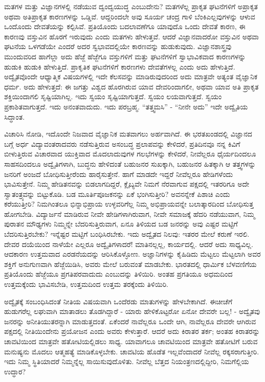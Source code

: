 ಮತಗಳ ಮತ್ತು ವಿಜ್ಞಾನಗಳಲ್ಲಿ ನಡೆಯುವ ದ್ವಂದ್ವಯುದ್ಧ ಎಂಬುದೇನು? ಮತಗಳೆಲ್ಲ ಪ್ರಾಕೃತ ಘಟನೆಗಳಿಗೆ ಅಪ್ರಾಕೃತ ಅಥವಾ ಅತಿಪ್ರಾಕೃತ ಕಾರಣಗಳನ್ನು ಒಡ್ಡಿವೆ. ಆದ್ದರಿಂದಲೇ ಅವು ಸೂರ್ಯ ಚಂದ್ರ ಗಾಳಿ ಬೆಂಕಿ\break ಎಲ್ಲವುಗಳನ್ನು ಆಳುವ ಒಂದೊಂದು ದೇವತೆಯನ್ನು ಕಲ್ಪಿಸಿವೆ. ಪ್ರತಿಯೊಂದು ಬದಲಾವಣೆಗೂ ಯಾವುದೊ ಒಂದು ದೇವತೆ ಕಾರಣ, ಈ ಕಾರಣವು ವಸ್ತುವಿನ ಹೊರಗೆ ಇರುವುದು ಎಂದು ಮತಗಳು ಹೇಳುತ್ತವೆ. ಆದರೆ ವಿಜ್ಞಾನವಾದರೋ ವಸ್ತುವಿನ ಅಥವಾ ಘಟನೆಯ ಒಳಗಡೆಯೇ ಎಂದರೆ ಅದರ ಸ್ವಭಾವದಲ್ಲಿಯೇ ಕಾರಣವನ್ನು ಹುಡುಕುವುದು. ವಿಜ್ಞಾನಶಾಸ್ತ್ರವು ಮುಂದುವರಿದ ಹಾಗೆಲ್ಲಾ ಅದು ಹೆಜ್ಜೆ ಹೆಜ್ಜೆಗೂ ವಸ್ತುಗಳಿಗೆ ಮತ್ತು ಘಟನೆಗಳಿಗೆ ಸ್ವಾಭಾವಿಕವಾದ ಕಾರಣಗಳನ್ನು ಹುಡುಕಿ ಹುಡುಕಿ ಹೇಳುತ್ತಿದೆ. ಪ್ರಾಕೃತಿಕ ಘಟನೆಗಳಿಗೆ ಕಾರಣಗಳು ದೇವತೆಗಳಲ್ಲ ಎಂದು ಅದು ಹೇಳುತ್ತಿದೆ. ಅದ್ವೈತವೊಂದೇ ಆಧ್ಯಾತ್ಮಿಕ ವಿಷಯಗಳಲ್ಲಿ ಇದೇ ಕೆಲಸವನ್ನು ಮಾಡಿರುವುದರಿಂದ ಅದು ಮಾತ್ರವೇ ಅತ್ಯಂತ ವೈಜ್ಞಾನಿಕ ಧರ್ಮ. ಅದು ಹೇಳುತ್ತದೆ: ಈ ಜಗತ್ತು ವಿಶ್ವದ ಹೊರಗಿರುವ ಯಾವ ದೇವರಿಂದಾಗಲೀ, ಅಥವಾ ಯಾವ ಅತಿ ಪ್ರಾಕೃತ ಶಕ್ತಿಯಿಂದಾಗಲಿ ಸೃಷ್ಟಿಯಾಗಿಲ್ಲ. ಇದು ಸ್ವಯಂ ಸೃಷ್ಟಿಯಾಗುತ್ತದೆ. ಸ್ವಯಂ ಲಯವಾಗುತ್ತದೆ. ಸ್ವಯಂ ಪ್ರಕಾಶಿತವಾಗುತ್ತದೆ. ಇದು ಅನಂತವಾದುದು. ಇದು ಪರಬ್ರಹ್ಮ. “ತತ್ತ್ವಮಸಿ” - “ನೀನೇ ಅದು” ಇದೇ ಅದ್ವೈತಿಯ ಸಿದ್ಧಾಂತ.

ವಿಚಾರಿಸಿ ನೋಡಿ, ಇದೊಂದೇ ನಿಜವಾದ ವೈಜ್ಞಾನಿಕ ಮತವಾಗಲು ಅರ್ಹವಾಗಿದೆ. ಈ ಭರತಖಂಡದಲ್ಲಿ ವಿಜ್ಞಾನದ ಬಗ್ಗೆ ಅರ್ಧ ವಿದ್ಯಾವಂತರಾದವರು ನಡೆಸುತ್ತಿರುವ ಅಸಂಬದ್ಧ ಪ್ರಲಾಪವನ್ನು ಕೇಳಿದರೆ, ಪ್ರತಿದಿನವೂ ನನ್ನ ಕಿವಿಗೆ ಬೀಳುತ್ತಿರುವ ವಿಚಾರವಾದ ಯುಕ್ತಿವಾದ ಮೊದಲಾದುವುಗಳ ಗಲಭೆಗಳನ್ನು ಕೇಳಿದರೆ, ನೀವೆಲ್ಲರೂ ಧೈರ್ಯದಿಂದಲೂ ಸಾಹಸದಿಂದಲೂ ಅದ್ವೈತಿಗಳಾಗಿ, ಬುದ್ಧನು ಹೇಳಿದಂತೆ ಬಹುಜನರ ಸುಖಕ್ಕಾಗಿ, ಬಹುಜನರ ಹಿತಕ್ಕಾಗಿ ಆ ತತ್ತ್ವಗಳನ್ನು ಜನರಿಗೆ ಅಂಜದೆ ಬೋಧಿಸುತ್ತೀರೆಂದು ಹಾರೈಸುತ್ತೇನೆ. ಹಾಗೆ ಮಾಡದೇ ಇದ್ದರೆ ನೀವೆಲ್ಲರೂ ಹೇಡಿಗಳೆಂದು ಭಾವಿಸುತ್ತೇನೆ. ನಿಮ್ಮ ಹೇಡಿತನವನ್ನು ಬಿಡಲಾಗದಿದ್ದರೆ, ಕ್ಲೈಬ್ಯವೇ ನಿಮಗೆ ನೆರವಾಗುವ ಪಕ್ಷದಲ್ಲಿ ಇತರರಿಗೂ ಅದೇ ಸ್ವಾತಂತ್ರ್ಯವನ್ನು ಬಿಟ್ಟುಕೊಡಿ. ಬಡ ಮೂರ್ತಿಪೂಜಕನನ್ನು ಏಕೆ ಭಂಗಿಸು\break ತ್ತೀರಿ? ಅವನನ್ನೇಕೆ ಪಿಶಾಚಿ ಎಂದು ಕರೆಯುತ್ತೀರಿ? ನಿಮಗಿಂತಲೂ ಭಿನ್ನಾಭಿಪ್ರಾಯ ಉಳ್ಳವರಿಗೆಲ್ಲ ನಿಮ್ಮ ಅಭಿಪ್ರಾಯವನ್ನೇ ಬಲಾತ್ಕಾರದಿಂದ ಬೋಧಿಸುತ್ತ ಹೋಗಬೇಡಿ. ವಿದ್ಯಾರ್ಜನೆ ಮಾಡಿರುವ ನೀವೇ ಹೇಡಿಗಳಾಗಿರುವಾಗ, ನೀವೇ ಸಮಾಜಕ್ಕೆ ಹೆದರಿ ನಡೆಯುವಾಗ, ನಿಮ್ಮ ಪುರಾತನ ಮೌಢ್ಯಗಳು ನಿಮ್ಮನ್ನೇ ಬೆದರಿಸುತ್ತಿರುವಾಗ, ಏನೂ ತಿಳಿಯದ ಬಡ ಜನರನ್ನು ಅವು ಎಷ್ಟರ ಮಟ್ಟಿಗೆ ಬೆದರಿಸುತ್ತಿರಬೇಕು? ಇನ್ನೆಷ್ಟರ ಮಟ್ಟಿಗೆ ಬಂಧಿಸಿರಬೇಕು. ಇದು ಅದ್ವೈತದ ನಿಲವು: ಇತರರ ಮೇಲೆ ಕರುಣೆ ಇರಲಿ. ದೇವರ ದಯೆಯಿಂದ ನಾಳೆಯೇ ಎಲ್ಲರೂ ಅದ್ವೈತಿಗಳಾದರೆ! ಮಾತಿನಲ್ಲಲ್ಲ, ಕಾರ್ಯದಲ್ಲಿ. ಆದರೆ ಅದು ಸಾಧ್ಯವಿಲ್ಲ. ಆದಕಾರಣ ಉತ್ತಮವಾದ ಎರಡನೆಯದನ್ನು ಆರಿಸಿಕೊಳ್ಳೋಣ. ಅಜ್ಞಾನಿಗಳನ್ನು ಕೈಹಿಡಿದು ಮೆಟ್ಟಲು ಮೆಟ್ಟಲಾಗಿ ಅವರ ಶಕ್ತಿಗೆ ಅನುಗುಣವಾಗಿ ಹೆಜ್ಜೆಯಿಡಿಸಿ, ಅವರು ಮೇಲೆ ಬರುವಂತೆ ಮಾಡಬೇಕು. ಭಾರತದಲ್ಲಿ ಧಾರ್ಮಿಕ ಬೆಳವಣಿಗೆಯ ಪ್ರತಿಯೊಂದು ಹೆಜ್ಜೆಯೂ ಪ್ರಗತಿಪರವಾದುದು ಎಂಬುದನ್ನು ತಿಳಿಯಿರಿ. ಅಂತಹ ಪ್ರಗತಿಯೂ ಅಧಮದಿಂದ ಉತ್ತಮಕ್ಕೆಂದು ಭಾವಿಸಬೇಡಿ, ಉತ್ತಮದಿಂದ ಉತ್ತಮ ತರಕ್ಕೆಂದು ತಿಳಿಯಿರಿ.

ಅದ್ವೈತಕ್ಕೆ ಸಂಬಂಧಿಸಿದಂತೆ ನೀತಿಯ ವಿಷಯವಾಗಿ ಒಂದೆರಡು ಮಾತುಗಳನ್ನು ಹೇಳಬೇಕಾಗಿದೆ. ಈಚೀಚೆಗೆ ಹುಡುಗರೆಲ್ಲ ಲಘುವಾಗಿ ಮಾತಾಡಲು ತೊಡಗಿದ್ದಾರೆ - ಯಾರು ಹೇಳಿಕೊಟ್ಟರೋ ಏನೋ ದೇವರೇ ಬಲ್ಲ! - ಅದ್ವೈತವು ಜನರನ್ನು ಅನೀತಿಯುತರನ್ನಾಗಿ ಮಾಡುತ್ತದಂತೆ. ಏಕೆಂದರೆ ನಾವೆಲ್ಲರೂ ಒಂದೇ ಆಗಿ, ನಾವೆಲ್ಲರೂ ದೇವರೇ ಆಗಿರುವ ಪಕ್ಷದಲ್ಲಿ ನೀತಿಯಿಂದೇನು ಪ್ರಯೋಜನ ಎಂದು ಅವರು ಕೇಳುತ್ತಾರೆ. ಆದರೆ ಅದು ಕಿರಾತರ ತರ್ಕ; ಅಂತಹ ಕಿರಾತರನ್ನು ಚಾವಟಿಯಿಂದ ಮಾತ್ರವೇ ಹತೋಟಿಯಲ್ಲಿಡಲು ಸಾಧ್ಯ. ಯಾವಾಗಲೂ ಚಾವಟಿಯಿಂದ ಮಾತ್ರವೇ ಹತೋಟಿಗೆ ಬರುವ ಮನುಷ್ಯನು ಮೊದಲು ಆತ್ಮಹತ್ಯೆ ಮಾಡಿಕೊಳ್ಳಬೇಕು. ಚಾವಟಿಯ ಹೊಡೆತ ಇಲ್ಲವೆಂದಾದರೆ ನೀವೆಲ್ಲ ರಕ್ಕಸರಾಗುತ್ತೀರಿ. ಇದು ನಿಮ್ಮ ಸ್ಥಿತಿಯಾದರೆ ನಿಮ್ಮನ್ನೆಲ್ಲ ಸಾಯಿಸುವುದೊಳಿತು. ನೀವೆಲ್ಲ ಬೆತ್ತದ ನಿಯಂತ್ರಣದಲ್ಲಿದ್ದೀರಿ, ನಿಮಗೆಲ್ಲಿಯ ಉದ್ಧಾರ?

